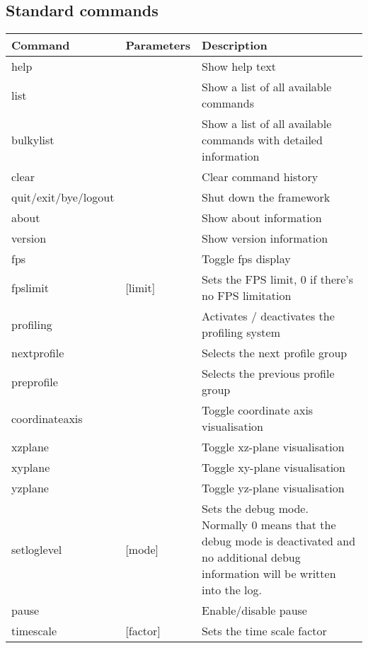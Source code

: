\subsection{Standard commands}
\begin{tabular}{|p{4cm}|p{2.4cm}|p{7.2cm}|}
\hline
\textbf{Command} & \textbf{Parameters} & \textbf{Description}\\
\hline
help                 &          & Show help text\\
\hline
list                 &          & Show a list of all available commands\\
\hline
bulkylist            &          & Show a list of all available commands with detailed information\\
\hline
clear                &          & Clear command history\\
\hline
quit/exit/bye/logout &          & Shut down the framework\\
\hline
about                &          & Show about information\\
\hline
version              &          & Show version information\\
\hline
fps                  &          & Toggle fps display\\
\hline
fpslimit             & [limit]  & Sets the FPS limit, 0 if there's no FPS limitation\\
\hline
profiling            &          & Activates / deactivates the profiling system\\
\hline
nextprofile          &          & Selects the next profile group\\
\hline
preprofile           &          & Selects the previous profile group\\
\hline
coordinateaxis       &          & Toggle coordinate axis visualisation\\
\hline
xzplane              &          & Toggle xz-plane visualisation\\
\hline
xyplane              &          & Toggle xy-plane visualisation\\
\hline
yzplane              &          & Toggle yz-plane visualisation\\
\hline
setloglevel          & [mode]   & Sets the debug mode. Normally 0 means that the debug mode is deactivated and no additional debug information will be written into the log.\\
\hline
pause                &          & Enable/disable pause\\
\hline
timescale            & [factor] & Sets the time scale factor\\
\hline
\end{tabular}


